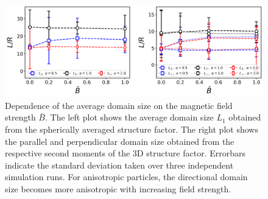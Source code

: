 
\begin{figure}
    \centering
    \includegraphics[scale = 0.4]{figures/results/paper1/D2a-vs-B_ss.png}
    \caption{Dependence of the average domain size on the magnetic field strength $\bar{B}$. The left plot shows the average domain size $L_1$ obtained from the spherically averaged structure factor. 
    The right plot shows the parallel and perpendicular domain size obtained from the respective second moments of the 3D structure factor. Errorbars indicate the standard deviation taken over 
    three independent simulation runs. For anisotropic particles, the directional domain size becomes more anisotropic with increasing field strength.}
    \label{fig:D2a_B}
\end{figure}



